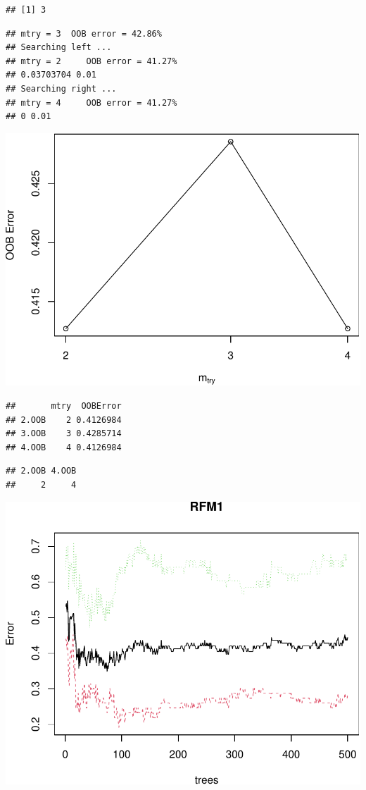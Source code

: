 \documentclass[11pt,preprint, authoryear]{elsarticle}
\numberwithin{equation}{section}
\numberwithin{figure}{section}
\numberwithin{table}{section}
\begin{document}
\begin{verbatim}
## [1] 3
\end{verbatim}

\begin{verbatim}
## mtry = 3  OOB error = 42.86% 
## Searching left ...
## mtry = 2     OOB error = 41.27% 
## 0.03703704 0.01 
## Searching right ...
## mtry = 4     OOB error = 41.27% 
## 0 0.01
\end{verbatim}

\includegraphics{ML_change_files/figure-latex/unnamed-chunk-10-1.pdf}

\begin{verbatim}
##       mtry  OOBError
## 2.OOB    2 0.4126984
## 3.OOB    3 0.4285714
## 4.OOB    4 0.4126984
\end{verbatim}

\begin{verbatim}
## 2.OOB 4.OOB 
##     2     4
\end{verbatim}

\includegraphics{ML_change_files/figure-latex/unnamed-chunk-13-1.pdf}
\end{document}

